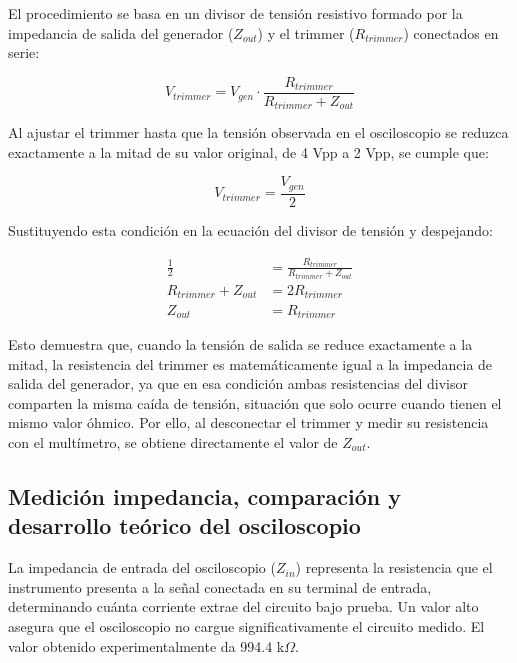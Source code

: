 \documentclass[journal, a4paper]{IEEEtran}
\begin{document}
El procedimiento se basa en un divisor de tensión resistivo formado por la impedancia de salida del generador ($Z_{out}$) y el trimmer ($R_{trimmer}$) conectados en serie:

\begin{equation}
V_{trimmer} = V_{gen} \cdot \frac{R_{trimmer}}{R_{trimmer} + Z_{out}}
\label{eq:divisor_trimmer}
\end{equation}

Al ajustar el trimmer hasta que la tensión observada en el osciloscopio se reduzca exactamente a la mitad de su valor original, de 4 Vpp a 2 Vpp, se cumple que:

\begin{equation}
V_{trimmer} = \frac{V_{gen}}{2}
\end{equation}

Sustituyendo esta condición en la ecuación del divisor de tensión y despejando:

\begin{equation}
\begin{aligned}
\frac{1}{2} &= \frac{R_{trimmer}}{R_{trimmer} + Z_{out}} \\
R_{trimmer} + Z_{out} &= 2R_{trimmer} \\
Z_{out} &= R_{trimmer}
\end{aligned}
\end{equation}

Esto demuestra que, cuando la tensión de salida se reduce exactamente a la mitad, la resistencia del trimmer es matemáticamente igual a la impedancia de salida del generador, ya que en esa condición ambas resistencias del divisor comparten la misma caída de tensión, situación que solo ocurre cuando tienen el mismo valor óhmico. Por ello, al desconectar el trimmer y medir su resistencia con el multímetro, se obtiene directamente el valor de $Z_{out}$.

\subsection{Medición impedancia, comparación y desarrollo teórico del osciloscopio}

La impedancia de entrada del osciloscopio ($Z_{in}$) representa la resistencia que el instrumento presenta a la señal conectada en su terminal de entrada, determinando cuánta corriente extrae del circuito bajo prueba. Un valor alto asegura que el osciloscopio no cargue significativamente el circuito medido. El valor obtenido experimentalmente da 994.4 k$\Omega$.
\end{document}
